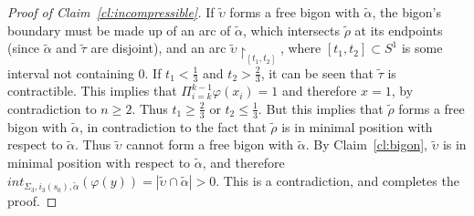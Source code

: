 \documentclass[11pt]{article}
\begin{document}
\begin{proof}[Proof of Claim~\ref{cl:incompressible}]
            If $\tilde{\upsilon}$ forms a free bigon with $\tilde{\alpha}$, the bigon's boundary must be made up of an arc of $\tilde{\alpha}$, which intersects $\tilde{\rho}$ at its endpoints (since $\tilde{\alpha}$ and $\tilde{\tau}$ are disjoint), and an arc $\tilde{\upsilon} \restriction_{[t_1,t_2]}$, where $[t_1,t_2] \subset S^1$ is some interval not containing 0. If $t_1 < \frac13$ and $t_2 > \frac23$, it can be seen that $\tilde{\tau}$ is contractible. This implies that $\Pi_{i=k}^{k-1} \varphi(x_i) = 1$ and therefore $x=1$, by contradiction to $n \geq 2$. Thus $t_1 \geq \frac23$ or $t_2 \leq \frac13$. But this implies that $\tilde{\rho}$ forms a free bigon with $\tilde{\alpha}$, in contradiction to the fact that $\tilde{\rho}$ is in minimal position with respect to $\tilde{\alpha}$. Thus $\tilde{\upsilon}$ cannot form a free bigon with $\tilde{\alpha}$. By Claim~\ref{cl:bigon}, $\tilde{\upsilon}$ is in minimal position with respect to $\tilde{\alpha}$, and therefore $int_{\Sigma_3,i_3(s_0),\tilde{\alpha}}(\varphi(y)) = |\tilde{\upsilon} \cap \tilde{\alpha}| > 0$. This is a contradiction, and completes the proof.
        \end{proof}



\end{document}
